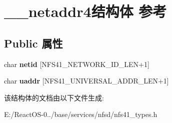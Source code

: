 \hypertarget{struct____netaddr4}{}\section{\+\_\+\+\_\+netaddr4结构体 参考}
\label{struct____netaddr4}
\subsection*{Public 属性}
\begin{DoxyCompactItemize}
\item 
\mbox{\label{struct____netaddr4_ad61382a1086a540cfe8e1ab269d61b17}} 
char {\bfseries netid} \mbox{[}N\+F\+S41\+\_\+\+N\+E\+T\+W\+O\+R\+K\+\_\+\+I\+D\+\_\+\+L\+EN+1\mbox{]}
\item 
\mbox{\label{struct____netaddr4_ad63842812f489b916c197944a6034b11}} 
char {\bfseries uaddr} \mbox{[}N\+F\+S41\+\_\+\+U\+N\+I\+V\+E\+R\+S\+A\+L\+\_\+\+A\+D\+D\+R\+\_\+\+L\+EN+1\mbox{]}
\end{DoxyCompactItemize}


该结构体的文档由以下文件生成\+:\begin{DoxyCompactItemize}
\item 
E\+:/\+React\+O\+S-\/0../base/services/nfsd/nfs41\+\_\+types.\+h\end{DoxyCompactItemize}
